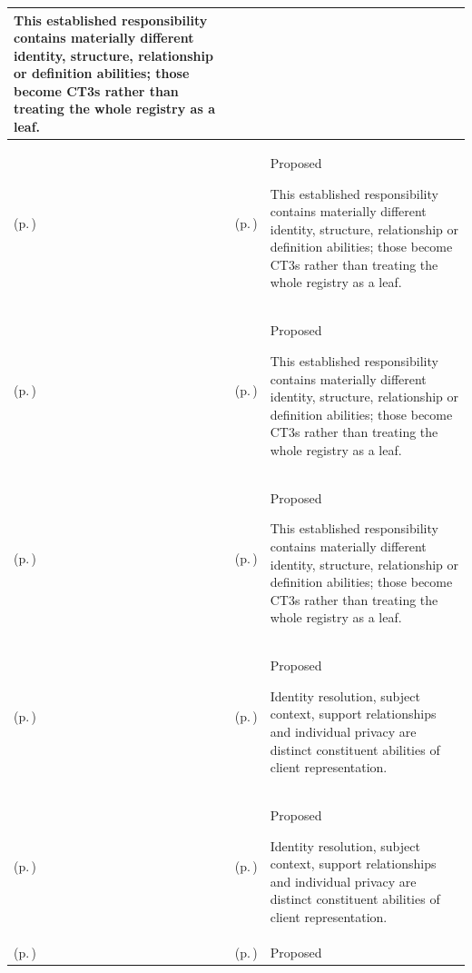 \begin{longtable}{|>{\raggedright\arraybackslash}p{0.27\TableWidth}|>{\raggedright\arraybackslash}p{0.27\TableWidth}|>{\raggedright\arraybackslash}p{0.46\TableWidth}|}
This established responsibility contains materially different identity, structure, relationship or definition abilities; those become CT3s rather than treating the whole registry as a leaf.\\\hline
\nameref{cap:bec-healthcare-entity-information-enablement} (p.\,\pageref{cap:bec-healthcare-entity-information-enablement}) & \nameref{cap:bec-health-service-administration} (p.\,\pageref{cap:bec-health-service-administration}) & Proposed

This established responsibility contains materially different identity, structure, relationship or definition abilities; those become CT3s rather than treating the whole registry as a leaf.\\\hline
\nameref{cap:bec-healthcare-entity-information-enablement} (p.\,\pageref{cap:bec-healthcare-entity-information-enablement}) & \nameref{cap:bec-health-product-administration} (p.\,\pageref{cap:bec-health-product-administration}) & Proposed

This established responsibility contains materially different identity, structure, relationship or definition abilities; those become CT3s rather than treating the whole registry as a leaf.\\\hline
\nameref{cap:bec-healthcare-entity-information-enablement} (p.\,\pageref{cap:bec-healthcare-entity-information-enablement}) & \nameref{cap:bec-clinical-device-administration} (p.\,\pageref{cap:bec-clinical-device-administration}) & Proposed

This established responsibility contains materially different identity, structure, relationship or definition abilities; those become CT3s rather than treating the whole registry as a leaf.\\\hline
\nameref{cap:bec-client-administration} (p.\,\pageref{cap:bec-client-administration}) & \nameref{cap:bec-person-identity} (p.\,\pageref{cap:bec-person-identity}) & Proposed

Identity resolution, subject context, support relationships and individual privacy are distinct constituent abilities of client representation.\\\hline
\nameref{cap:bec-client-administration} (p.\,\pageref{cap:bec-client-administration}) & \nameref{cap:bec-healthcare-subject} (p.\,\pageref{cap:bec-healthcare-subject}) & Proposed

Identity resolution, subject context, support relationships and individual privacy are distinct constituent abilities of client representation.\\\hline
\nameref{cap:bec-client-administration} (p.\,\pageref{cap:bec-client-administration}) & \nameref{cap:bec-client-relationship} (p.\,\pageref{cap:bec-client-relationship}) & Proposed


\end{longtable}
